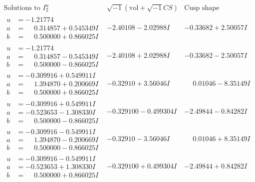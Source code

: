 \documentclass[1p]{elsarticle_modified}
\theoremstyle{definition}
\newcommand{\I}{\sqrt{-1}}
\begin{document}
$$\begin{array}{c|c|c}  
\text{Solutions to }I^u_{2}& \I (\text{vol} + \sqrt{-1}CS) & \text{Cusp shape}\\
 \hline 
\begin{aligned}
u &= -1.21774\phantom{ +0.000000I} \\
a &= \phantom{-}0.314857 + 0.545349 I \\
b &= \phantom{-}0.500000 + 0.866025 I\end{aligned}
 & -2.40108 - 2.02988 I & -0.33682 + 2.50057 I \\ \hline\begin{aligned}
u &= -1.21774\phantom{ +0.000000I} \\
a &= \phantom{-}0.314857 - 0.545349 I \\
b &= \phantom{-}0.500000 - 0.866025 I\end{aligned}
 & -2.40108 + 2.02988 I & -0.33682 - 2.50057 I \\ \hline\begin{aligned}
u &= -0.309916 + 0.549911 I \\
a &= \phantom{-}1.394870 + 0.200669 I \\
b &= \phantom{-}0.500000 + 0.866025 I\end{aligned}
 & -0.32910 + 3.56046 I & \phantom{-}0.01046 - 8.35149 I \\ \hline\begin{aligned}
u &= -0.309916 + 0.549911 I \\
a &= -0.523653 - 1.308330 I \\
b &= \phantom{-}0.500000 - 0.866025 I\end{aligned}
 & -0.329100 - 0.499304 I & -2.49844 - 0.84282 I \\ \hline\begin{aligned}
u &= -0.309916 - 0.549911 I \\
a &= \phantom{-}1.394870 - 0.200669 I \\
b &= \phantom{-}0.500000 - 0.866025 I\end{aligned}
 & -0.32910 - 3.56046 I & \phantom{-}0.01046 + 8.35149 I \\ \hline\begin{aligned}
u &= -0.309916 - 0.549911 I \\
a &= -0.523653 + 1.308330 I \\
b &= \phantom{-}0.500000 + 0.866025 I\end{aligned}
 & -0.329100 + 0.499304 I & -2.49844 + 0.84282 I \\ \hline\begin{aligned}

\end{aligned}
\end{array}$$
\end{document}
